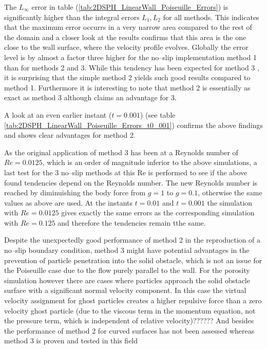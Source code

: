 \documentclass{report}
\begin{document}
The $L_\infty$ error in table (\ref{tab:2DSPH_LinearWall_Poiseuille_Errors}) is significantly higher than the integral errors $L_1, L_2$ for all methods. This indicates that the maximum error occurrs in a very narrow area compared to the rest of the domain and a closer look at the results confirms that this area is the one close to the wall surface, where the velocity profile evolves.
Globally the error level is by almost a factor three higher for the no--slip implementation method 1 than for methods 2 and 3. While this tendency has been expected for method 3 \cite{Basa2009}, it is surprising that the simple method 2 yields such good results compared to method 1. Furthermore it is interesting to note that method 2 is essentially as exact as method 3 although \cite{Morris1997} claims an advantage for 3.

A look at an even earlier instant ($t=0.001$) (see table \ref{tab:2DSPH_LinearWall_Poiseuille_Errors_t0_001}) confirms the above findings and shows clear advantages for method 2.

As the original application of method 3 has been at a Reynolds number of $Re=0.0125$, which is an order of magnitude inferior to the above simulations, a last test for the 3 no--slip methods at this Re is performed to see if the above found tendencies depend on the Reynolds number. The new Reynolds number is reached by diminuishing the body force from $g=1$ to $g=0.1$, otherwise the same values as above are used. At the instants $t=0.01$ and $t=0.001$ the simulation with $Re=0.0125$ gives exactly the same errors as the corresponding simulation with $Re=0.125$ and therefore the tendencies remain tthe same. 

Despite the unexpectedly good performance of method 2 in the reproduction of a no--slip boundary condition, method 3 might have potential advantages in the prevention of particle penetration into the solid obstacle, which is not an issue for the Poiseuille case due to the flow purely parallel to the wall. For the porosity simulation however there are cases where particles approach the solid obstacle surface with a significant normal velocity component. In this case the virtual velocity assignment for ghost particles creates a higher repulsive force than a zero velocity ghost particle (due to the viscous term in the momentum equation, not the pressure term, which is independent of relative velocity)??????
And besides the performance of method 2 for curved surfaces has not been assessed whereas method 3 is proven and tested in this field \cite{Morris1997, Morris1999}
\end{document}
